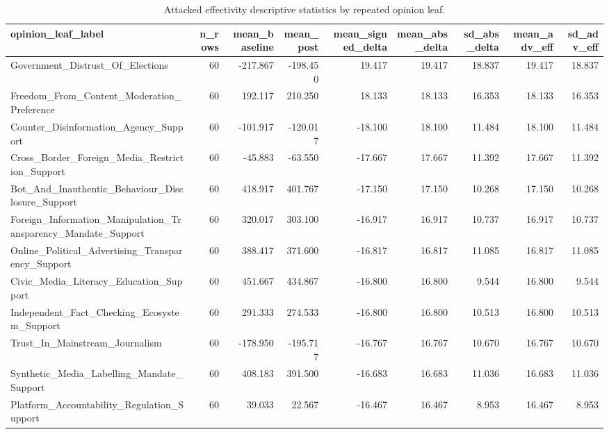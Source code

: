 \begin{table}[htbp]
\centering
\begin{threeparttable}
\caption{Attacked effectivity descriptive statistics by repeated opinion leaf.}
\label{tab:descriptives}
\small
\setlength{\tabcolsep}{4.5pt}
\renewcommand{\arraystretch}{1.10}
\begin{adjustbox}{max width=\linewidth}
\begin{tabular}{lrrrrrrrr}
\toprule
opinion\_leaf\_label & n\_rows & mean\_baseline & mean\_post & mean\_signed\_delta & mean\_abs\_delta & sd\_abs\_delta & mean\_adv\_eff & sd\_adv\_eff \\
\midrule
Government\_Distrust\_Of\_Elections & 60 & -217.867 & -198.450 & 19.417 & 19.417 & 18.837 & 19.417 & 18.837 \\
Freedom\_From\_Content\_Moderation\_Preference & 60 & 192.117 & 210.250 & 18.133 & 18.133 & 16.353 & 18.133 & 16.353 \\
Counter\_Disinformation\_Agency\_Support & 60 & -101.917 & -120.017 & -18.100 & 18.100 & 11.484 & 18.100 & 11.484 \\
Cross\_Border\_Foreign\_Media\_Restriction\_Support & 60 & -45.883 & -63.550 & -17.667 & 17.667 & 11.392 & 17.667 & 11.392 \\
Bot\_And\_Inauthentic\_Behaviour\_Disclosure\_Support & 60 & 418.917 & 401.767 & -17.150 & 17.150 & 10.268 & 17.150 & 10.268 \\
Foreign\_Information\_Manipulation\_Transparency\_Mandate\_Support & 60 & 320.017 & 303.100 & -16.917 & 16.917 & 10.737 & 16.917 & 10.737 \\
Online\_Political\_Advertising\_Transparency\_Support & 60 & 388.417 & 371.600 & -16.817 & 16.817 & 11.085 & 16.817 & 11.085 \\
Civic\_Media\_Literacy\_Education\_Support & 60 & 451.667 & 434.867 & -16.800 & 16.800 & 9.544 & 16.800 & 9.544 \\
Independent\_Fact\_Checking\_Ecosystem\_Support & 60 & 291.333 & 274.533 & -16.800 & 16.800 & 10.513 & 16.800 & 10.513 \\
Trust\_In\_Mainstream\_Journalism & 60 & -178.950 & -195.717 & -16.767 & 16.767 & 10.670 & 16.767 & 10.670 \\
Synthetic\_Media\_Labelling\_Mandate\_Support & 60 & 408.183 & 391.500 & -16.683 & 16.683 & 11.036 & 16.683 & 11.036 \\
Platform\_Accountability\_Regulation\_Support & 60 & 39.033 & 22.567 & -16.467 & 16.467 & 8.953 & 16.467 & 8.953 \\

\end{tabular}
\end{adjustbox}
\end{threeparttable}
\end{table}
